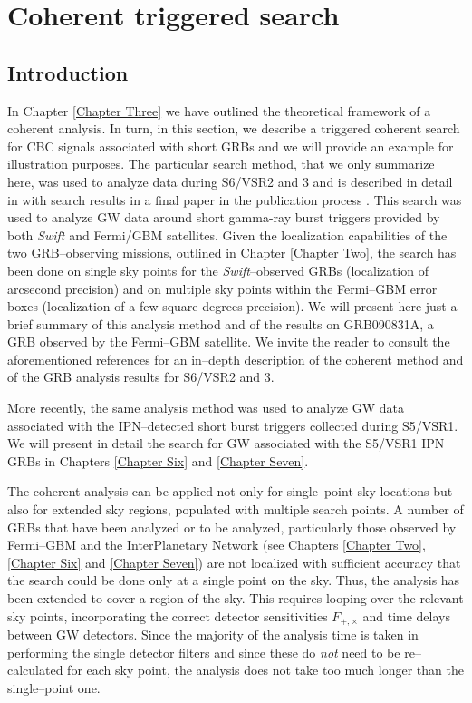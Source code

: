 \section{Coherent triggered search}

\subsection{Introduction}

In Chapter \ref{Chapter Three} we have outlined the theoretical framework of a coherent analysis. In turn, in this section, we describe a triggered coherent search for \ac{CBC} signals associated with short GRBs and we will provide an example for illustration purposes. The particular search method, that we only summarize here, was used to analyze data during S6/VSR2 and 3 and is described in detail in \cite{Harry:2011qh} with search results in a final paper in the publication process \cite{lvc:s6grb}. This search was used to analyze \ac{GW} data around short gamma-ray burst triggers provided by both \emph{Swift} and Fermi/GBM satellites. Given the localization capabilities of the two GRB--observing missions, outlined in Chapter \ref{Chapter Two}, the search has been done on single sky points for the \emph{Swift}--observed GRBs (localization of arcsecond precision) and on multiple sky points within the Fermi--GBM error boxes (localization of a few square degrees precision). We will present here just a brief summary of this analysis method and of the results on GRB090831A, a GRB observed by the Fermi--GBM satellite. We invite the reader to consult the aforementioned references for an in--depth description of the coherent method and of the GRB analysis results for S6/VSR2 and 3. 

More recently, the same analysis method was used to analyze GW data associated with the IPN--detected short burst triggers collected during S5/VSR1. We will present in detail the search for GW associated with the S5/VSR1 IPN GRBs in Chapters \ref{Chapter Six} and \ref{Chapter Seven}.

The coherent analysis can be applied not only for single--point sky locations but also for extended sky regions, populated with multiple search points. A number of \ac{GRB}s that have been analyzed or to be analyzed, particularly those observed by Fermi--GBM and the InterPlanetary Network (see Chapters \ref{Chapter Two}, \ref{Chapter Six} and \ref{Chapter Seven}) are not localized with sufficient accuracy that the search could be done only at a single point on the sky.  Thus, the analysis has been extended to cover a region of the sky.  This requires looping over the relevant sky points, incorporating the correct detector sensitivities $F_{+,\times}$ and time delays between \ac{GW} detectors.  Since the majority of the analysis time is taken in performing the single detector filters and since these do \textit{not} need to be re--calculated for each sky point, the analysis does not take too much longer than the single--point one.  


